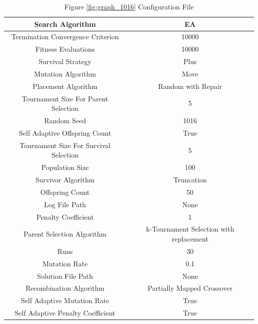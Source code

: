 \documentclass{standalone}
\begin{document}
\begin{table}[!htb]
	\centering
	\caption{Figure \ref{fig:graph_1016} Configuration File}
	\label{tab:graph_1016}
	\begin{tabular}{| c | c |}
		\hline
		Search Algorithm		& EA		 \\
		\hline
		Termination Convergence Criterion		& 10000		 \\
		\hline
		Fitness Evaluations		& 10000		 \\
		\hline
		Survival Strategy		& Plus		 \\
		\hline
		Mutation Algorithm		& Move		 \\
		\hline
		Placement Algorithm		& Random with Repair		 \\
		\hline
		Tournament Size For Parent Selection		& 5		 \\
		\hline
		Random Seed		& 1016		 \\
		\hline
		Self Adaptive Offspring Count		& True		 \\
		\hline
		Tournament Size For Survival Selection		& 5		 \\
		\hline
		Population Size		& 100		 \\
		\hline
		Survivor Algorithm		& Truncation		 \\
		\hline
		Offspring Count		& 50		 \\
		\hline
		Log File Path		& None		 \\
		\hline
		Penalty Coefficient		& 1		 \\
		\hline
		Parent Selection Algorithm		& k-Tournament Selection with replacement		 \\
		\hline
		Runs		& 30		 \\
		\hline
		Mutation Rate		& 0.1		 \\
		\hline
		Solution File Path		& None		 \\
		\hline
		Recombination Algorithm		& Partially Mapped Crossover		 \\
		\hline
		Self Adaptive Mutation Rate		& True		 \\
		\hline
		Self Adaptive Penalty Coefficient		& True		 \\
		\hline
	\end{tabular}
\end{table}
\end{document}
